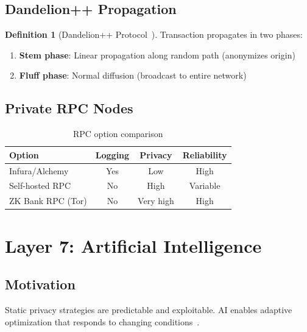 \documentclass[11pt]{article}
\theoremstyle{definition}
\newtheorem{definition}{Definition}[section]
\theoremstyle{plain}
\theoremstyle{remark}
\begin{document}
\subsection{Dandelion++ Propagation}

\begin{definition}[Dandelion++ Protocol~\cite{venkatakrishnan2017dandelion}]
Transaction propagates in two phases:
\begin{enumerate}
    \item \textbf{Stem phase}: Linear propagation along random path (anonymizes origin)
    \item \textbf{Fluff phase}: Normal diffusion (broadcast to entire network)
\end{enumerate}
\end{definition}

\subsection{Private RPC Nodes}

\begin{table}[H]
\centering
\caption{RPC option comparison}
\label{tab:rpc}
\begin{tabular}{lccc}
\toprule
\textbf{Option} & \textbf{Logging} & \textbf{Privacy} & \textbf{Reliability} \\
\midrule
Infura/Alchemy & Yes & Low & High \\
Self-hosted RPC & No & High & Variable \\
ZK Bank RPC (Tor) & No & Very high & High \\
\bottomrule
\end{tabular}
\end{table}

\section{Layer 7: Artificial Intelligence}
\label{sec:layer7}

\subsection{Motivation}

Static privacy strategies are predictable and exploitable. AI enables adaptive optimization that responds to changing conditions~\cite{nasr2018machine}.
\end{document}
